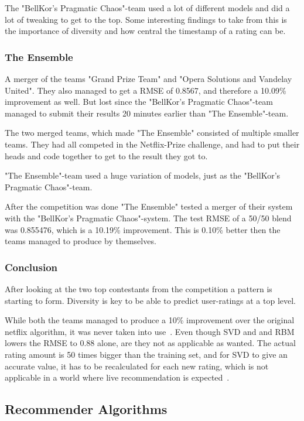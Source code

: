 The "BellKor's Pragmatic Chaos"-team used a lot of different models and did a lot of tweaking to get to the top. Some interesting findings to take from this is the importance of diversity and how central the timestamp of a rating can be.

\subsubsection{The Ensemble}

A merger of the teams "Grand Prize Team" and "Opera Solutions and Vandelay United". They also managed to get a RMSE of 0.8567, and therefore a 10.09\% improvement as well. But lost since the "BellKor's Pragmatic Chaos"-team managed to submit their results 20 minutes earlier than "The Ensemble"-team.

The two merged teams, which made "The Ensemble" consisted of multiple smaller teams. They had all competed in the Netflix-Prize challenge, and had to put their heads and code together to get to the result they got to.

"The Ensemble"-team used a huge variation of models, just as the "BellKor's Pragmatic Chaos"-team.

After the competition was done "The Ensemble" tested a merger of their system with the "BellKor's Pragmatic Chaos"-system. The test RMSE of a 50/50 blend was 0.855476, which is a 10.19\% improvement. This is 0.10\% better then the teams managed to produce by themselves.

\subsubsection{Conclusion}
After looking at the two top contestants from the competition a pattern is starting to form. Diversity is key to be able to predict user-ratings at a top level.

While both the teams managed to produce a 10\% improvement over the original netflix algorithm, it was never taken into use~\cite{nfbeyond5}. Even though SVD and and RBM lowers the RMSE to 0.88 alone, are they not as applicable as wanted. The actual rating amount is 50 times bigger than the training set, and for SVD to give an accurate value, it has to be recalculated for each new rating, which is not applicable in a world where live recommendation is expected~\cite{nfbeyond5}.


\subsection{Recommender Algorithms}
